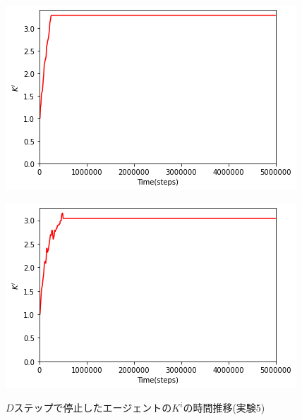 \documentclass[12pt,a4j,twoside]{jarticle}
\begin{document}
  \begin{figure}
    \begin{minipage}{0.48\hsize}
      \centering
      \includegraphics[width=0.99\hsize]{figures/CorrectionTransition_CountStop_18.png}
      \label{subfig:transition_count_18}
    \end{minipage}
    \hfill
    \begin{minipage}{0.48\hsize}
      \centering
      \includegraphics[width=0.99\hsize]{figures/CorrectionTransition_CountStop_7.png}
      \label{subfig:transition_count_7}
    \end{minipage}
    \caption{$D$ステップで停止したエージェントの$K^i$の時間推移(実験5)}
    \label{fig:transition_early_count}
  \vspace{12pt}
    \begin{minipage}{0.48\hsize}
      \centering

\end{minipage}
\end{figure}
\end{document}
